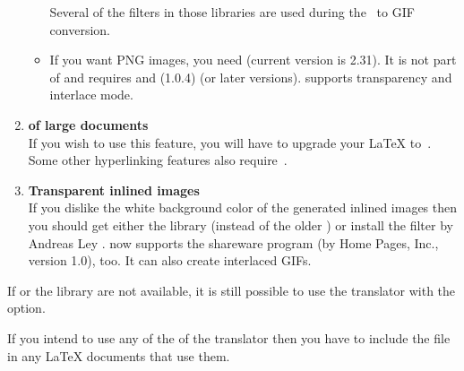\begin{enumerate}
\begin{itemize}
Several of the filters in those libraries are used during the \PS\ to
GIF conversion. 
%
%
\item 
If you want PNG images, you need  (current version is 2.31).
It is not part of  and requires  and
 (1.0.4) (or later versions).
 supports transparency and interlace mode.
\end{itemize}


%
%
\item 
\textbf{ of large documents}\\
If you wish to use this feature, you will have to upgrade your
\LaTeX{} to \LaTeXe\,. 
Some other hyperlinking features also require \LaTeXe\,.

%
%
\item 
\textbf{Transparent inlined images}\\
If you dislike the white background color of the
generated inlined images then you should get either 
the  library (instead of the older ) 
or install the 
filter by Andreas Ley . 
\latextohtml{} now supports the shareware program 
(by Home Pages, Inc., version 1.0), too.
It can also create interlaced GIFs.
%
\end{enumerate} 

%

\noindent
If  or the  library are
not available, it is still possible to use the translator with the
 option. 

%
%
\html{\\}%

If you intend to use any of the 
of the translator 
then you have to include the  file 
in any \LaTeX{}  documents that use them. 

%
%
\html{\\}%

